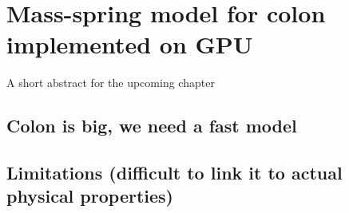 \chapter{Mass-spring model for colon implemented on GPU }
\label{chap8}
\begin{shortAbstract}
A short abstract for the upcoming chapter
\end{shortAbstract}


\section{Colon is big, we need a fast model}
		
\section{Limitations (difficult to link it to actual physical properties)}